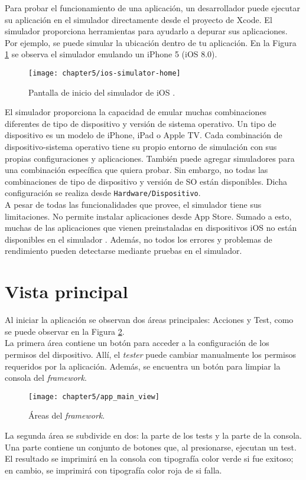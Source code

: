 Para probar el funcionamiento de una aplicación, un desarrollador puede ejecutar su aplicación en el simulador directamente desde el proyecto de Xcode. El simulador proporciona herramientas para ayudarlo a depurar sus aplicaciones. Por ejemplo, se puede simular la ubicación dentro de tu aplicación. En la Figura \ref{fig:ch05:ios-simulator-home} se observa el simulador emulando un iPhone 5 (iOS 8.0).\\
\begin{figure}[tbp]
    \centering
	\texttt{[image: chapter5/ios-simulator-home]}
	\caption{Pantalla de inicio del simulador de iOS \cite{iosds}.}
    \label{fig:ch05:ios-simulator-home}
\end{figure}
El simulador proporciona la capacidad de emular muchas combinaciones diferentes de tipo de dispositivo y versión de sistema operativo. Un tipo de dispositivo es un modelo de iPhone, iPad o Apple TV. Cada combinación de dispositivo-sistema operativo tiene su propio entorno de simulación con sus propias configuraciones y aplicaciones. También puede agregar simuladores para una combinación específica que quiera probar. Sin embargo, no todas las combinaciones de tipo de dispositivo y versión de SO están disponibles. Dicha configuración se realiza desde \texttt{Hardware/Dispositivo}.\\

A pesar de todas las funcionalidades que provee, el simulador tiene sus limitaciones. No permite instalar aplicaciones desde App Store. Sumado a esto, muchas de las aplicaciones que vienen preinstaladas en dispositivos iOS no están disponibles en el simulador \cite{iosds}. Además, no todos los errores y problemas de rendimiento pueden detectarse mediante pruebas en el simulador.
\newpage
\section{Vista principal} \label{sec:main-view}
Al iniciar la aplicación se observan dos áreas principales: Acciones y Test, como se puede observar en la Figura \ref{fig:chapter05:main_view}.\\

La primera área contiene un botón para acceder a la configuración de los permisos del dispositivo. Allí, el \textit{tester} puede cambiar manualmente los permisos requeridos por la aplicación. Además, se encuentra un botón para limpiar la consola del \textit{framework}.\\

\begin{figure}[hbtp]
    \centering
	\texttt{[image: chapter5/app\_main\_view]}
	\caption{Áreas del \textit{framework}.}
	\label{fig:chapter05:main_view}
\end{figure}
La segunda área se subdivide en dos: la parte de los tests y la parte de la consola. Una parte contiene un conjunto de botones que, al presionarse, ejecutan un test. El resultado se imprimirá en la consola con tipografía color verde si fue exitoso; en cambio, se imprimirá con tipografía color roja de si falla.\\

